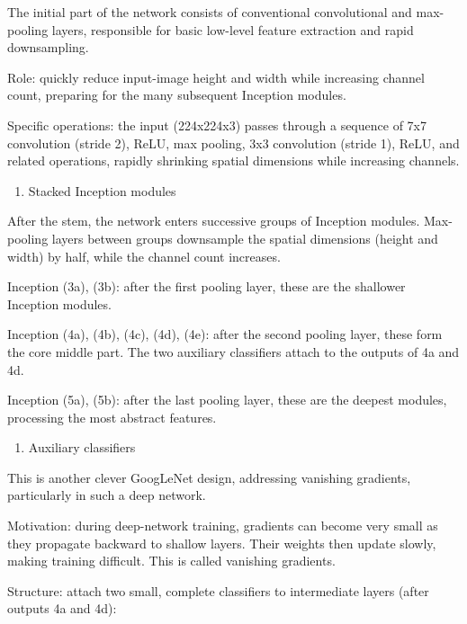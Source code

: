 The initial part of the network consists of conventional convolutional and max-pooling layers, responsible for basic low-level feature extraction and rapid downsampling.

Role: quickly reduce input-image height and width while increasing channel count, preparing for the many subsequent Inception modules.

Specific operations: the input (224x224x3) passes through a sequence of 7x7 convolution (stride 2), ReLU, max pooling, 3x3 convolution (stride 1), ReLU, and related operations, rapidly shrinking spatial dimensions while increasing channels.

\begin{enumerate}
\def\labelenumi{\arabic{enumi}.}
\setcounter{enumi}{1}
\tightlist
\item
  Stacked Inception modules
\end{enumerate}

After the stem, the network enters successive groups of Inception modules. Max-pooling layers between groups downsample the spatial dimensions (height and width) by half, while the channel count increases.

Inception (3a), (3b): after the first pooling layer, these are the shallower Inception modules.

Inception (4a), (4b), (4c), (4d), (4e): after the second pooling layer, these form the core middle part. The two auxiliary classifiers attach to the outputs of 4a and 4d.

Inception (5a), (5b): after the last pooling layer, these are the deepest modules, processing the most abstract features.

\begin{enumerate}
\def\labelenumi{\arabic{enumi}.}
\setcounter{enumi}{2}
\tightlist
\item
  Auxiliary classifiers
\end{enumerate}

This is another clever GoogLeNet design, addressing vanishing gradients, particularly in such a deep network.

Motivation: during deep-network training, gradients can become very small as they propagate backward to shallow layers. Their weights then update slowly, making training difficult. This is called vanishing gradients.

Structure: attach two small, complete classifiers to intermediate layers (after outputs 4a and 4d):

